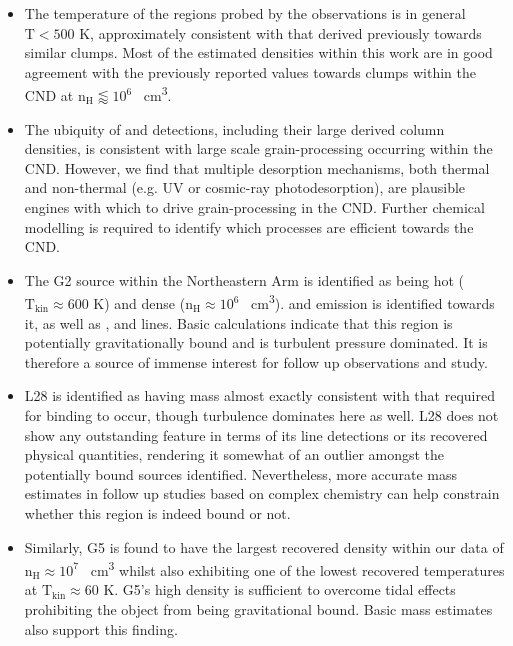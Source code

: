 \documentclass[twocolumn]{aastex631}
\begin{document}
\begin{itemize}
    \item The temperature of the regions probed by the observations is in general $\mathrm{T} < 500$ \si{\kelvin}, approximately consistent with that derived previously towards similar clumps. Most of the estimated densities within this work are in good agreement with the previously reported values towards clumps within the CND at $\mathrm{n_{H}} \lessapprox 10^{6}$ \si{\per\centi\meter\cubed}.
    
    \item The ubiquity of  and  detections, including their large derived column densities, is consistent with large scale grain-processing occurring within the CND. However, we find that multiple desorption mechanisms, both thermal and non-thermal (e.g. UV or cosmic-ray photodesorption), are plausible engines with which to drive grain-processing in the CND. Further chemical modelling is required to identify which processes are efficient towards the CND.
    
    \item The G2 source within the Northeastern Arm is identified as being hot ($\mathrm{T_{kin}} \approx 600$ \si{\kelvin}) and dense ($\mathrm{n_{H}} \approx 10^{6}$ \si{\per\centi\meter\cubed}).  and  emission is identified towards it, as well as ,  and  lines. Basic calculations indicate that this region is potentially gravitationally bound and is turbulent pressure dominated. It is therefore a source of immense interest for follow up observations and study. 
    
    \item L28 is identified as having mass almost exactly consistent with that required for binding to occur, though turbulence dominates here as well. L28 does not show any outstanding feature in terms of its line detections or its recovered physical quantities, rendering it somewhat of an outlier amongst the potentially bound sources identified. Nevertheless, more accurate mass estimates in follow up studies based on complex chemistry can help constrain whether this region is indeed bound or not.
    
    \item Similarly, G5 is found to have the largest recovered density within our data of $\mathrm{n_{H}} \approx 10^{7}$ \si{\per\centi\meter\cubed} whilst also exhibiting one of the lowest recovered temperatures at $\mathrm{T_{kin}} \approx 60$ \si{\kelvin}. G5's high density is sufficient to overcome tidal effects prohibiting the object from being gravitational bound. Basic mass estimates also support this finding.
    

\end{itemize}
\end{document}
